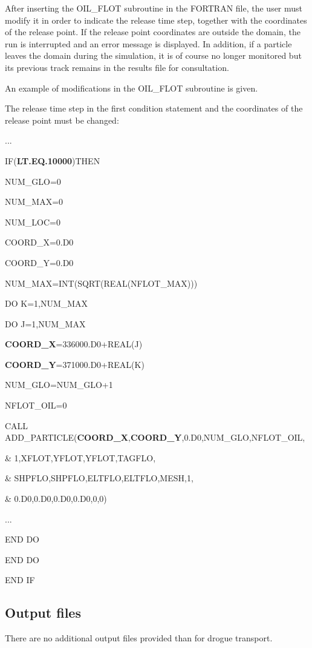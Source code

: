  After inserting the OIL\_FLOT subroutine in the FORTRAN file, the user must modify it in order to indicate the release time step, together with the coordinates of the release point. If the release point coordinates are outside the domain, the run is interrupted and an error message is displayed. In addition, if a particle leaves the domain during the simulation, it is of course no longer monitored but its previous track remains in the results file for consultation.

 An example of modifications in the OIL\_FLOT subroutine is given.

 The release time step in the first condition statement and the coordinates of the release point must be changed:

...

IF(\textbf{LT.EQ.10000})THEN

  NUM\_GLO=0

  NUM\_MAX=0

  NUM\_LOC=0

  COORD\_X=0.D0

  COORD\_Y=0.D0

  NUM\_MAX=INT(SQRT(REAL(NFLOT\_MAX)))

  DO K=1,NUM\_MAX

    DO J=1,NUM\_MAX

      \textbf{COORD\_X}=336000.D0+REAL(J)

      \textbf{COORD\_Y}=371000.D0+REAL(K)

      NUM\_GLO=NUM\_GLO+1

      NFLOT\_OIL=0

      CALL ADD\_PARTICLE(\textbf{COORD\_X},\textbf{COORD\_Y},0.D0,NUM\_GLO,NFLOT\_OIL,

\&                       1,XFLOT,YFLOT,YFLOT,TAGFLO,

\&                       SHPFLO,SHPFLO,ELTFLO,ELTFLO,MESH,1,

\&                       0.D0,0.D0,0.D0,0.D0,0,0)

...

    END DO

  END DO

END IF


\subsection{ Output files}

 There are no additional output files provided than for drogue transport.

